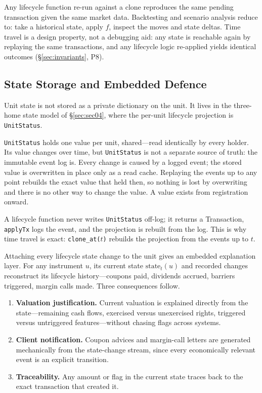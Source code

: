 \noindent Any lifecycle function re-run against a clone reproduces the same pending transaction given the same market data. Backtesting and scenario analysis reduce to: take a historical state, apply $f$, inspect the moves and state deltas. Time travel is a design property, not a debugging aid: any state is reachable again by replaying the same transactions, and any lifecycle logic re-applied yields identical outcomes (\S\ref{sec:invariants}, P8).

\subsection{State Storage and Embedded Defence}

Unit state is not stored as a private dictionary on the unit. It lives in the three-home state model of \S\ref{sec:sec04}, where the per-unit lifecycle projection is \texttt{UnitStatus}.

\begin{remark}
\texttt{UnitStatus} holds one value per unit, shared---read identically by every holder. Its value changes over time, but \texttt{UnitStatus} is not a separate source of truth: the immutable event log is. Every change is caused by a logged event; the stored value is overwritten in place only as a read cache. Replaying the events up to any point rebuilds the exact value that held then, so nothing is lost by overwriting and there is no other way to change the value. A value exists from registration onward.
\end{remark}

\noindent A lifecycle function never writes \texttt{UnitStatus} off-log; it returns a Transaction, \texttt{applyTx} logs the event, and the projection is rebuilt from the log. This is why time travel is exact: \texttt{clone\_at($t$)} rebuilds the projection from the events up to $t$.

Attaching every lifecycle state change to the unit gives an embedded explanation layer. For any instrument $u$, its current state $\text{state}_t(u)$ and recorded changes reconstruct its lifecycle history---coupons paid, dividends accrued, barriers triggered, margin calls made. Three consequences follow.

\begin{enumerate}[nosep]
\item \textbf{Valuation justification.} Current valuation is explained directly from the state---remaining cash flows, exercised versus unexercised rights, triggered versus untriggered features---without chasing flags across systems.
\item \textbf{Client notification.} Coupon advices and margin-call letters are generated mechanically from the state-change stream, since every economically relevant event is an explicit transition.
\item \textbf{Traceability.} Any amount or flag in the current state traces back to the exact transaction that created it.
\end{enumerate}

